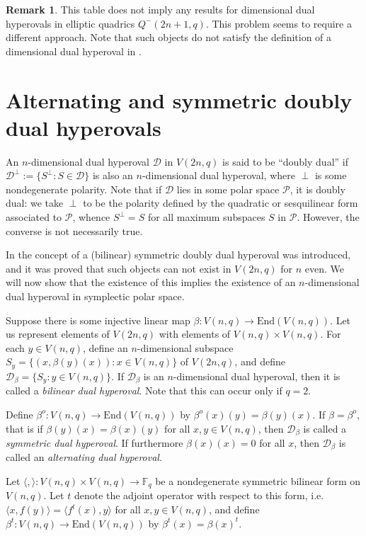 \documentclass{amsart}
\theoremstyle{plain}
\theoremstyle{definition}
\newtheorem{remark}{Remark}
\begin{document}
\begin{remark}
This table does not imply any results for dimensional dual hyperovals in elliptic quadrics $Q^{-}(2n+1,q)$. This problem seems to require a different approach. Note that such objects do not satisfy the definition of a dimensional dual hyperoval in \cite{DeKa2015}.
\end{remark}

\section{Alternating and symmetric doubly dual hyperovals}
\label{sec:demp}
 
An $n$-dimensional dual hyperoval ${\mathcal D}$ in $V(2n,q)$ is said to be ``doubly dual'' if ${\mathcal D}^{\perp} := \{S^{\perp}:S \in {\mathcal D}\}$ is also an $n$-dimensional dual hyperoval, where $\perp$ is some nondegenerate polarity. Note that if ${\mathcal D}$ lies in some polar space ${\mathcal{P}}$, it is doubly dual: we take $\perp$ to be the polarity defined by the quadratic or sesquilinear form associated to ${\mathcal{P}}$, whence $S^{\perp}=S$ for all maximum subspaces $S$ in ${\mathcal{P}}$. However, the converse is not necessarily true.

In \cite{Dempwolff2015} the concept of a (bilinear) symmetric doubly dual hyperoval was introduced, and it was proved that such objects can not exist in $V(2n,q)$ for $n$ even. We will now show that the existence of this implies the existence of an $n$-dimensional dual hyperoval in symplectic polar space.

Suppose there is some injective linear map $\beta:V(n,q)\rightarrow {\mathrm{End}}(V(n,q))$. Let us represent elements of $V(2n,q)$ with elements of $V(n,q)\times V(n,q)$. For each $y\in V(n,q)$, define an $n$-dimensional subspace $S_{y} = \{(x,\beta(y)(x)):x \in V(n,q)\}$ of $V(2n,q)$, and define ${\mathcal D}_{\beta} = \{S_y:y \in V(n,q)\}$. If ${\mathcal D}_{\beta}$ is an $n$-dimensional dual hyperoval, then it is called a \emph{bilinear dual hyperoval}. Note that this can occur only if $q=2$. 

Define $\beta^o:V(n,q)\rightarrow {\mathrm{End}}(V(n,q))$ by $\beta^o(x)(y) = \beta(y)(x)$. If $\beta=\beta^o$, that is if $\beta(y)(x) = \beta(x)(y)$ for all $x,y \in V(n,q)$, then ${\mathcal D}_{\beta}$ is called a \emph{symmetric dual hyperoval}. If furthermore $\beta(x)(x)=0$ for all $x$, then ${\mathcal D}_{\beta}$ is called an \emph{alternating dual hyperoval}.

Let $\langle,\rangle : V(n,q)\times V(n,q) \rightarrow {{\mathbb{F}}_q}$ be a nondegenerate symmetric bilinear form on $V(n,q)$. Let $t$ denote the adjoint operator with respect to this form, i.e. $\langle x,f(y)\rangle = \langle f^t(x),y\rangle$ for all $x,y \in V(n,q)$, and define $\beta^t:V(n,q)\rightarrow {\mathrm{End}}(V(n,q))$ by $\beta^t(x) = \beta(x)^t$.
\end{document}
